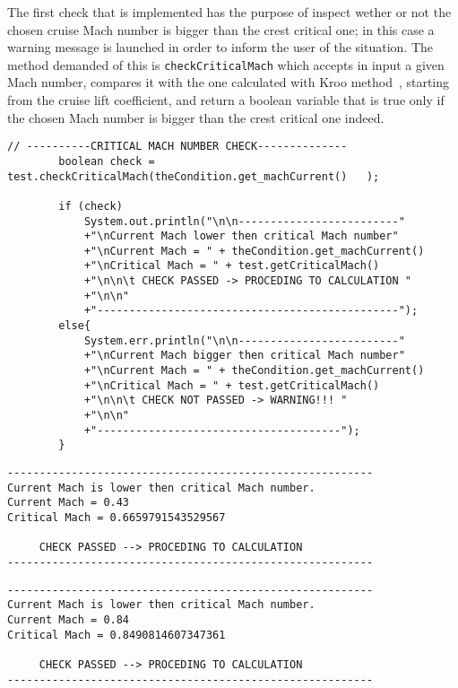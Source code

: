 \bigskip
\noindent
The first check that is implemented has the purpose of inspect wether or not the chosen cruise Mach number is bigger than the crest critical one; in this case a warning message is launched in order to inform the user of the situation. The method demanded of this is \lstinline[language=Java]!checkCriticalMach! which accepts in input a given Mach number, compares it with the one calculated with Kroo method~\cite{Ciornei:CriticalMach}, starting from the cruise lift coefficient, and return a boolean variable that is true only if the chosen Mach number is bigger than the crest critical one indeed. 

\bigskip
\begin{lstlisting}[caption={Excerpt of the ATR-72 Payload-Range test - critical Mach number check}, captionpos=b, tabsize=2]
		// ----------CRITICAL MACH NUMBER CHECK--------------
		boolean check = test.checkCriticalMach(theCondition.get_machCurrent()	);
		
		if (check)
			System.out.println("\n\n-------------------------"
			+"\nCurrent Mach lower then critical Mach number"
			+"\nCurrent Mach = " + theCondition.get_machCurrent() 
			+"\nCritical Mach = " + test.getCriticalMach() 
			+"\n\n\t CHECK PASSED -> PROCEDING TO CALCULATION "
			+"\n\n"
			+"-----------------------------------------------");
		else{
			System.err.println("\n\n-------------------------"
			+"\nCurrent Mach bigger then critical Mach number"
			+"\nCurrent Mach = " + theCondition.get_machCurrent() 
			+"\nCritical Mach = " + test.getCriticalMach() 
			+"\n\n\t CHECK NOT PASSED -> WARNING!!! "
			+"\n\n"
			+"--------------------------------------");
		}
\end{lstlisting}

\bigskip
\begin{lstlisting}[caption={Excerpt of the ATR-72 Payload-Range test results - critical Mach number check}, captionpos=b, tabsize=2]
---------------------------------------------------------
Current Mach is lower then critical Mach number.
Current Mach = 0.43
Critical Mach = 0.6659791543529567

	 CHECK PASSED --> PROCEDING TO CALCULATION 
---------------------------------------------------------
\end{lstlisting}

\bigskip
\begin{lstlisting}[caption={Excerpt of the B747-100B Payload-Range test results - critical Mach number check}, captionpos=b, tabsize=2]
---------------------------------------------------------
Current Mach is lower then critical Mach number.
Current Mach = 0.84
Critical Mach = 0.8490814607347361

	 CHECK PASSED --> PROCEDING TO CALCULATION 
---------------------------------------------------------
\end{lstlisting}

